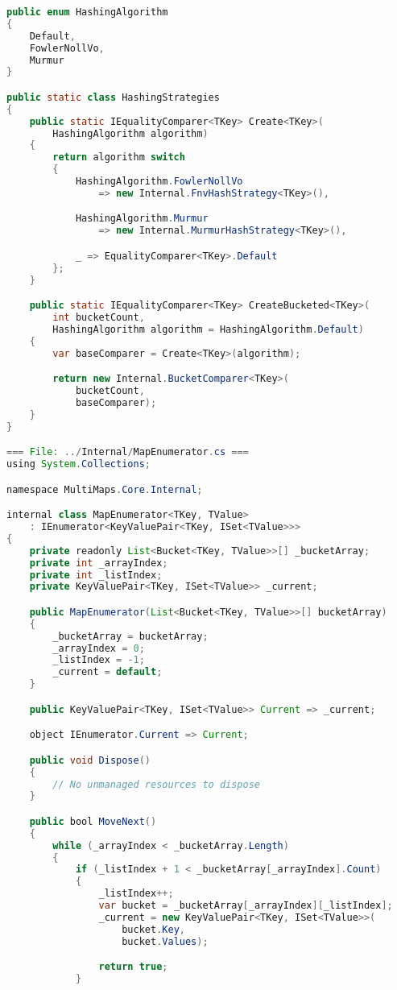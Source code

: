 \documentclass[12pt]{article}
\begin{document}
\begin{lstlisting}[language=Java]
public enum HashingAlgorithm
{
    Default,
    FowlerNollVo,
    Murmur
}

public static class HashingStrategies
{
    public static IEqualityComparer<TKey> Create<TKey>(
        HashingAlgorithm algorithm)
    {
        return algorithm switch
        {
            HashingAlgorithm.FowlerNollVo
                => new Internal.FnvHashStrategy<TKey>(),

            HashingAlgorithm.Murmur
                => new Internal.MurmurHashStrategy<TKey>(),

            _ => EqualityComparer<TKey>.Default
        };
    }

    public static IEqualityComparer<TKey> CreateBucketed<TKey>(
        int bucketCount,
        HashingAlgorithm algorithm = HashingAlgorithm.Default)
    {
        var baseComparer = Create<TKey>(algorithm);

        return new Internal.BucketComparer<TKey>(
            bucketCount,
            baseComparer);
    }
}

=== File: ../Internal/MapEnumerator.cs ===
using System.Collections;

namespace MultiMaps.Core.Internal;

internal class MapEnumerator<TKey, TValue>
    : IEnumerator<KeyValuePair<TKey, ISet<TValue>>>
{
    private readonly List<Bucket<TKey, TValue>>[] _bucketArray;
    private int _arrayIndex;
    private int _listIndex;
    private KeyValuePair<TKey, ISet<TValue>> _current;

    public MapEnumerator(List<Bucket<TKey, TValue>>[] bucketArray)
    {
        _bucketArray = bucketArray;
        _arrayIndex = 0;
        _listIndex = -1;
        _current = default;
    }

    public KeyValuePair<TKey, ISet<TValue>> Current => _current;

    object IEnumerator.Current => Current;

    public void Dispose()
    {
        // No unmanaged resources to dispose
    }

    public bool MoveNext()
    {
        while (_arrayIndex < _bucketArray.Length)
        {
            if (_listIndex + 1 < _bucketArray[_arrayIndex].Count)
            {
                _listIndex++;
                var bucket = _bucketArray[_arrayIndex][_listIndex];
                _current = new KeyValuePair<TKey, ISet<TValue>>(
                    bucket.Key,
                    bucket.Values);

                return true;
            }


\end{lstlisting}
\end{document}
